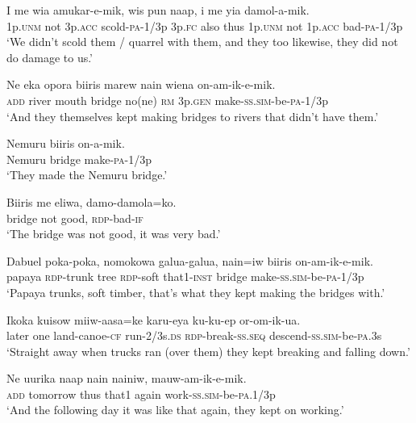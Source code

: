 \ea
\gll  I  me  wia  amukar-e-mik,  wis  pun  naap, i  me  yia  damol-a-mik. \\
1p.\textsc{unm}  not  3p.\textsc{acc}  scold-\textsc{pa}-1/3p  3p.\textsc{fc}  also  thus 1p.\textsc{unm}  not  1p.\textsc{acc}  bad-\textsc{pa}-1/3p \\ 
\glt ‘We didn’t scold them / quarrel with them, and they too likewise, they did not do damage to us.’ \\
\z


\ea
\gll  Ne  eka  opora  biiris  marew  nain  wiena  on-am-ik-e-mik. \\
\textsc{add}  river  mouth  bridge  no(ne)  \textsc{rm}  3p.\textsc{gen} make-\textsc{ss}.\textsc{sim}-be-\textsc{pa}-1/3p \\ 
\glt ‘And they themselves kept making bridges to rivers that didn’t have them.’ \\
\z


\ea
\gll  Nemuru  biiris  on-a-mik. \\
Nemuru  bridge  make-\textsc{pa}-1/3p \\
\glt ‘They made the Nemuru bridge.’ \\
\z


\ea
\gll  Biiris  me  eliwa,  damo-damola=ko. \\
bridge  not  good,  \textsc{rdp}-bad-\textsc{if} \\
\glt ‘The bridge was not good, it was very bad.’ \\
\z


\ea
\gll  Dabuel  poka-poka,  nomokowa  galua-galua,  nain=iw  biiris  on-am-ik-e-mik. \\
papaya  \textsc{rdp}-trunk  tree  \textsc{rdp}-soft that1-\textsc{inst}  bridge  make-\textsc{ss}.\textsc{sim}-be-\textsc{pa}-1/3p\\ 
\glt ‘Papaya trunks, soft timber, that’s what they kept making the bridges with.’ \\
\z


\ea
\gll  Ikoka  kuisow  miiw-aasa=ke  karu-eya  ku-ku-ep   or-om-ik-ua. \\
later  one  land-canoe-\textsc{cf}  run-2/3s.\textsc{ds}  \textsc{rdp}-break-\textsc{ss.seq} descend-\textsc{ss}.\textsc{sim}-be-\textsc{pa}.3s \\ 
\glt ‘Straight away when trucks ran (over them) they kept breaking and falling down.’ \\
\z


\ea
\gll  Ne  uurika  naap  nain  nainiw,  mauw-am-ik-e-mik. \\
\textsc{add}  tomorrow  thus  that1  again  work-\textsc{ss}.\textsc{sim}-be-\textsc{pa}.1/3p \\
\glt ‘And the following day it was like that again, they kept on working.’ \\
\z


